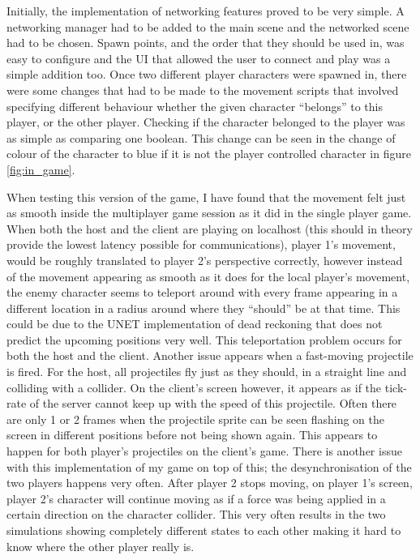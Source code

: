 Initially, the implementation of networking features proved to be very simple. A networking manager had to be added to the main scene and the networked scene had to be chosen. Spawn points, and the order that they should be used in, was easy to configure and the UI that allowed the user to connect and play was a simple addition too. Once two different player characters were spawned in, there were some changes that had to be made to the movement scripts that involved specifying different behaviour whether the given character ``belongs'' to this player, or the other player. Checking if the character belonged to the player was as simple as comparing one boolean. This change can be seen in the change of colour of the character to blue if it is not the player controlled character in figure \ref{fig:in_game}.

When testing this version of the game, I have found that the movement felt just as smooth inside the multiplayer game session as it did in the single player game. When both the host and the client are playing on localhost (this should in theory provide the lowest latency possible for communications), player 1's movement, would be roughly translated to player 2's perspective correctly, however instead of the movement appearing as smooth as it does for the local player's movement, the enemy character seems to teleport around with every frame appearing in a different location in a radius around where they ``should'' be at that time. This could be due to the UNET implementation of dead reckoning that does not predict the upcoming positions very well. This teleportation problem occurs for both the host and the client. Another issue appears when a fast-moving projectile is fired. For the host, all projectiles fly just as they should, in a straight line and colliding with a collider. On the client's screen however, it appears as if the tick-rate of the server cannot keep up with the speed of this projectile. Often there are only 1 or 2 frames when the projectile sprite can be seen flashing on the screen in different positions before not being shown again. This appears to happen for both player's projectiles on the client's game. There is another issue with this implementation of my game on top of this; the desynchronisation of the two players happens very often. After player 2 stops moving, on player 1's screen, player 2's character will continue moving as if a force was being applied in a certain direction on the character collider. This very often results in the two simulations showing completely different states to each other making it hard to know where the other player really is.

